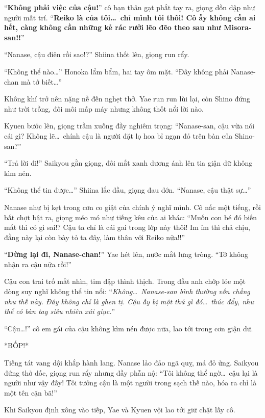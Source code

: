 \documentclass[../main.tex]{subfiles}
\begin{document}
``\textbf{Không phải việc của cậu!}'' cô bạn thân gạt phắt tay ra, giọng dồn dập như người mất trí. ``\textbf{Reiko là của tôi\dots\ chỉ mình tôi thôi! Cô ấy không cần ai hết, càng không cần những kẻ rác rưởi lẽo đẽo theo sau như Misora-san!!}''

``Nanase, cậu điên rồi sao!?'' Shiina thốt lên, giọng run rẩy.


``Không thể nào\dots'' Honoka lẩm bẩm, hai tay ôm mặt. ``Đây không phải Nanase-chan mà tớ biết\dots''

Không khí trở nên nặng nề đến nghẹt thở. Yae run run lùi lại, còn Shino đứng như trời trồng, đôi môi mấp máy nhưng không thốt nổi lời nào.

Kyuen bước lên, giọng trầm xuống đầy nghiêm trọng: ``Nanase-san, cậu vừa nói cái gì? Không lẽ\dots\ chính cậu là người đặt lọ hoa bỉ ngạn đỏ trên bàn của Shino-san?''

``Trả lời đi!'' Saikyou gằn giọng, đôi mắt xanh dương ánh lên tia giận dữ không kìm nén.

``Không thể tin được\dots'' Shiina lắc đầu, giọng đau đớn. ``Nanase, cậu thật sự\dots''

Nanase như bị kẹt trong cơn co giật của chính ý nghĩ mình. Cô nấc một tiếng, rồi bất chợt bật ra, giọng méo mó như tiếng kêu của ai khác: ``Muốn con bé đó biến mất thì có gì sai!? Cậu ta chỉ là cái gai trong lớp này thôi! Im ỉm thì chả chịu, đằng này lại còn bày tỏ ta đây, làm thân với Reiko nữa!!''

``\textbf{Dừng lại đi, Nanase-chan!}'' Yae hét lên, nước mắt lưng tròng. ``Tớ không nhận ra cậu nữa rồi!''

Cậu con trai trố mắt nhìn, tim đập thình thịch. Trong đầu anh chớp lóe một dòng suy nghĩ không thể tin nổi: ``\textit{Không\dots\ Nanase-san bình thường vốn chẳng như thế này. Đây không chỉ là ghen tị. Cậu ấy bị một thứ gì đó\dots\ thúc đẩy, như thể có bàn tay siêu nhiên xúi giục.}''

``Cậu\dots!'' cô em gái của cậu không kìm nén được nữa, lao tới trong cơn giận dữ.

*BỐP!*

Tiếng tát vang dội khắp hành lang. Nanase lảo đảo ngã quỵ, má đỏ ửng. Saikyou đứng thở dốc, giọng run rẩy nhưng đầy phẫn nộ: ``Tôi không thể ngờ\dots\ cậu lại là người như vậy đấy! Tôi tưởng cậu là một người trong sạch thế nào, hóa ra chỉ là một tên cặn bã!''

Khi Saikyou định xông vào tiếp, Yae và Kyuen vội lao tới giữ chặt lấy cô.
\end{document}
